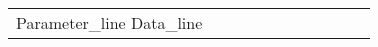 \documentclass[preview]{standalone}
\begin{document}
\begin{center}
\begin{tabular}{|c|c|c|c|c|c|c|c|c|c|c|}
\hline
Parameter_line
\hline\hline
Data_line
\end{tabular}
\end{center}
\end{document}
